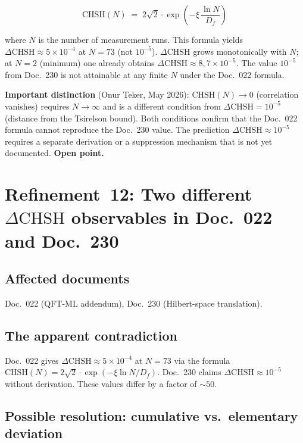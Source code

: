 \begin{equation}
  \text{CHSH}(N) \;=\; 2\sqrt{2}\cdot\exp\!\left(-\xi\,\frac{\ln N}{D_f}\right)
  \tag{190.20}
\end{equation}

where $N$ is the number of measurement runs. This formula yields
$\Delta\text{CHSH} \approx 5\times10^{-4}$ at $N=73$ (not $10^{-5}$).
$\Delta\text{CHSH}$ grows monotonically with $N$; at $N=2$ (minimum) one
already obtains $\Delta\text{CHSH} \approx 8{,}7\times10^{-5}$. The value
$10^{-5}$ from Doc.~230 is not attainable at any finite $N$ under the Doc.~022
formula.

\textbf{Important distinction} (Onur Teker, May 2026): $\text{CHSH}(N)\to 0$
(correlation vanishes) requires $N\to\infty$ and is a different condition from
$\Delta\text{CHSH}=10^{-5}$ (distance from the Tsirelson bound). Both
conditions confirm that the Doc.~022 formula cannot reproduce the Doc.~230
value. The prediction $\Delta\text{CHSH}\approx 10^{-5}$ requires a separate
derivation or a suppression mechanism that is not yet documented.
\textbf{Open point.}

\section{\texorpdfstring{Refinement~12: Two different $\Delta\text{CHSH}$ observables in Doc.~022 and Doc.~230}{Refinement 12: Two different CHSH observables}}

\subsection*{Affected documents}

Doc.~022 (QFT-ML addendum), Doc.~230 (Hilbert-space translation).

\subsection*{The apparent contradiction}

Doc.~022 gives $\Delta\text{CHSH} \approx 5\times10^{-4}$ at $N=73$ via the
formula $\text{CHSH}(N) = 2\sqrt{2}\cdot\exp(-\xi\ln N/D_f)$. Doc.~230 claims
$\Delta\text{CHSH} \approx 10^{-5}$ without derivation. These values differ by
a factor of $\sim50$.

\subsection*{Possible resolution: cumulative vs.\ elementary deviation}

